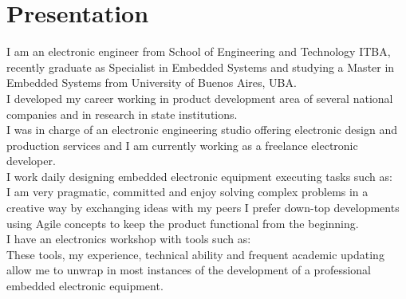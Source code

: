 \section{Presentation}
I am an electronic engineer from School of Engineering and Technology ITBA,
recently graduate as Specialist in Embedded Systems and studying a
Master in Embedded Systems from University of Buenos Aires, UBA.\\
I developed my career working in product development area of several
national companies and in research in state institutions.\\
I was in charge of an electronic engineering studio offering electronic design
and production services and I am currently working as a freelance electronic
developer. \\ %
I work daily designing embedded electronic equipment executing tasks such as: \\
I am very pragmatic, committed and enjoy solving complex problems in a creative way by exchanging ideas
with my peers I prefer down-top developments using Agile concepts to keep the product functional from
the beginning.\\
I have an electronics workshop with tools such as:\\
These tools, my experience, technical ability and frequent academic updating allow me to unwrap
in most instances of the development of a professional embedded electronic equipment.\\
